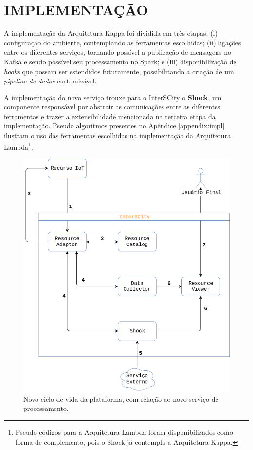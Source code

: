 \section{IMPLEMENTAÇÃO}

A implementação da Arquitetura Kappa foi dividida em três etapas:
(i) configuração do ambiente, contemplando as ferramentas escolhidas;
(ii) ligações entre os diferentes serviços, tornando possível a publicação de
    mensagens no Kafka e sendo possível seu processamento no Spark; e
(iii) disponibilização de \textit{hooks} que possam ser estendidos futuramente,
    possibilitando a criação de um \textit{pipeline de dados} customizável.

A implementação do novo serviço trouxe para o InterSCity o \textbf{Shock},
um componente responsável por abstrair as comunicações entre as diferentes
ferramentas e trazer a extensibilidade mencionada na terceira etapa da
implementação. Pseudo algoritmos presentes no Apêndice \ref{appendix:impl}
ilustram o uso das ferramentas escolhidas na implementação da Arquitetura
Lambda\footnote{
Pseudo códigos para a Arquitetura Lambda foram disponibilizados como forma
de complemento, pois o Shock já contempla a Arquitetura Kappa.
}.

\begin{figure}
  \centering
    \includegraphics[scale=0.45]{figuras/shock_usage.png}
    \caption{Novo ciclo de vida da plataforma, com relação ao novo serviço de processamento.}
  \label{fig:shock_usage}
\end{figure}

